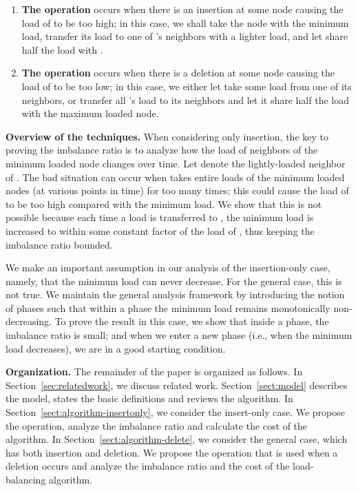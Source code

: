 \documentclass[a4paper]{article}
\begin{document}
\begin{enumerate}

\item {\bf The {\minbalance} operation} occurs when there is an
  insertion at some node  causing the load of  to be too high;
  in this case, we shall take the node  with the minimum load, transfer
  its load to one of 's neighbors with a lighter load, and let 
  share half the load with .

\item {\bf The {\split} operation} occurs when there is a deletion at
  some node  causing the load of  to be too low; in this case,
  we either let  take some load from one of its neighbors, or
  transfer all 's load to its neighbors and let it share half the
  load with the maximum loaded node.

\end{enumerate}

\textbf{Overview of the techniques.}  When considering only insertion,
the key to proving the imbalance ratio is to analyze how the load of 
neighbors of the minimum loaded node changes over time.  Let 
denote the lightly-loaded neighbor of .  The bad situation can occur
when  takes  entire loads of the minimum loaded nodes (at
various points in time) for too many times; this could cause the load
of  to be too high compared with the minimum load.  We show that this
is not possible because  each time a load is transferred to , the
minimum load is increased to within some constant factor of the load
of , thus keeping the imbalance ratio bounded.

We make an important assumption in our analysis of the insertion-only
case, namely, that the minimum load can never decrease.  For the
general case, this is not true.  We maintain the general analysis
framework by introducing the notion of phases such that within a
phase the minimum load remains monotonically non-decreasing.  To prove
the result in this case, we show that inside a phase, the imbalance
ratio is small; and when we enter a new phase (i.e., when the minimum
load decreases), we are in a good starting condition.


\textbf{Organization.} The remainder of the paper is organized
as follows. In Section~\ref{sec:relatedwork}, we discuss related
work. Section~\ref{sect:model} describes the model, states the basic
definitions and reviews the {\adjload} algorithm. In
Section~\ref{sect:algorithm-insertonly}, we consider the insert-only
case. We propose the {\minbalance} operation, analyze the imbalance
ratio and calculate the cost of the algorithm. In
Section~\ref{sect:algorithm-delete}, we consider the general case,
which has both insertion and deletion.  We propose the {\split}
operation that is used when a deletion occurs and analyze the imbalance
ratio and the cost of the load-balancing algorithm.
\end{document}
